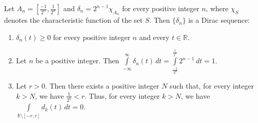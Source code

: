 \documentclass[12pt]{article}
\begin{document}
Let $\displaystyle A_n=\left[\frac{-1}{2^n},\frac{1}{2^n}\right]$ and $\delta_n=2^{n-1}\chi_{A_n}$ for every positive integer $n$, where $\chi_S$ denotes the characteristic function of the set $S$.  Then $\{\delta_n\}$ is a Dirac sequence:

\begin{enumerate}
\item $\delta_n(t)\ge 0$ for every positive integer $n$ and every $t\in\mathbb{R}$.
\item Let $n$ be a positive integer.  Then $\displaystyle \int\limits_{-\infty}^{\infty} \delta_n(t) \, dt=\int\limits_{\frac{-1}{2^n}}^{\frac{1}{2^n}} 2^{n-1} \, dt=1$.

\item Let $r>0$.  Then there exists a positive integer $N$ such that, for every integer $k>N$, we have $\displaystyle \frac{1}{2^k}<r$.  Thus, for every integer $k>N$, we have $\displaystyle \int\limits_{\mathbb{R}\setminus\left[ -r,r\right]} d_k(t) \, dt=0$.
\end{enumerate}
\end{document}
